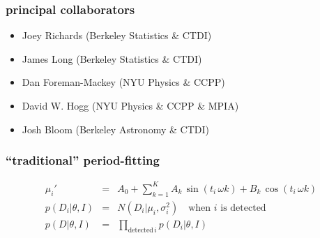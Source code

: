 \documentclass[pdftex]{beamer}
\begin{document}
\begin{frame}
\end{frame}

\begin{frame}
  \frametitle{principal collaborators}
  \begin{itemize}
  \item Joey Richards (Berkeley Statistics \& CTDI)
  \item James Long (Berkeley Statistics \& CTDI)
  \item Dan Foreman-Mackey (NYU Physics \& CCPP)
  \item David W. Hogg (NYU Physics \& CCPP \& MPIA)
  \item Josh Bloom (Berkeley Astronomy \& CTDI)
  \end{itemize}
\end{frame}

\begin{frame}
  \frametitle{``traditional'' period-fitting}
\begin{eqnarray}\displaystyle
\mu_i' &=& A_0 + \sum_{k=1}^K A_k\, \sin (t_i \, \omega  k) + B_k\, \cos (t_i \, \omega  k)
\nonumber \\
p(D_i|\theta,I) &=& N(D_i|\mu_i,\sigma^2_i) \quad \mbox{when $i$ is detected}
\nonumber \\
p(D|\theta,I) &=& \prod_{\mbox{detected}\,i} p(D_i|\theta,I)
\nonumber
\end{eqnarray}
\end{frame}
\end{document}
